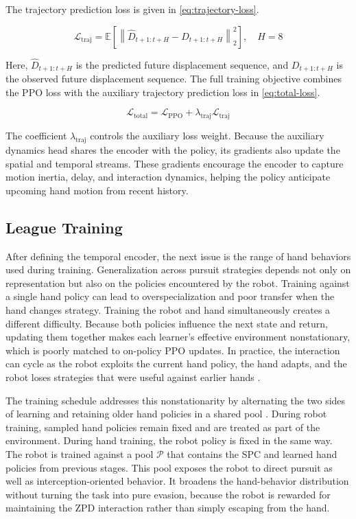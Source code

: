 \documentclass[journal,twoside,web]{ieeecolor2}
\begin{document}
The trajectory prediction loss is given in \eqref{eq:trajectory-loss}.

\begin{equation}
\mathcal{L}_{\mathrm{traj}}
= \mathbb{E}\!\left[
\left\|\widehat{D}_{t+1:t+H}-D_{t+1:t+H}\right\|_2^2
\right], \quad H=8
\label{eq:trajectory-loss}
\end{equation}

Here, $\widehat{D}_{t+1:t+H}$ is the predicted future displacement sequence, and $D_{t+1:t+H}$ is the observed future displacement sequence. The full training objective combines the PPO loss with the auxiliary trajectory prediction loss in \eqref{eq:total-loss}.

\begin{equation}
\mathcal{L}_{\mathrm{total}} = \mathcal{L}_{\mathrm{PPO}} + \lambda_{\mathrm{traj}}\mathcal{L}_{\mathrm{traj}}
\label{eq:total-loss}
\end{equation}

The coefficient $\lambda_{\mathrm{traj}}$ controls the auxiliary loss weight. Because the auxiliary dynamics head shares the encoder with the policy, its gradients also update the spatial and temporal streams. These gradients encourage the encoder to capture motion inertia, delay, and interaction dynamics, helping the policy anticipate upcoming hand motion from recent history.

\subsection{League Training}
\label{subsec:league-training}
After defining the temporal encoder, the next issue is the range of hand behaviors used during training. Generalization across pursuit strategies depends not only on representation but also on the policies encountered by the robot. Training against a single hand policy can lead to overspecialization and poor transfer when the hand changes strategy. Training the robot and hand simultaneously creates a different difficulty. Because both policies influence the next state and return, updating them together makes each learner's effective environment nonstationary, which is poorly matched to on-policy PPO updates. In practice, the interaction can cycle as the robot exploits the current hand policy, the hand adapts, and the robot loses strategies that were useful against earlier hands \cite{lanctotUnifiedMARL2017}.

The training schedule addresses this nonstationarity by alternating the two sides of learning and retaining older hand policies in a shared pool \cite{vinyalsAlphaStar2019,jaderbergPopulationGames2019}. During robot training, sampled hand policies remain fixed and are treated as part of the environment. During hand training, the robot policy is fixed in the same way. The robot is trained against a pool $\mathcal{P}$ that contains the SPC and learned hand policies from previous stages. This pool exposes the robot to direct pursuit as well as interception-oriented behavior. It broadens the hand-behavior distribution without turning the task into pure evasion, because the robot is rewarded for maintaining the ZPD interaction rather than simply escaping from the hand.
\end{document}
